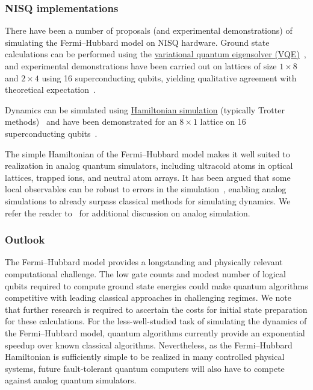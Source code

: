 \begin{refsection}
\subsubsection*{NISQ implementations}
There have been a number of proposals (and experimental demonstrations) of simulating the Fermi--Hubbard model on NISQ hardware. Ground state calculations can be performed using the \hyperref[prim:VQA]{variational quantum eigensolver (VQE)}~\cite{jiang2018,reiner2018, reiner2019,cai2020,cade2020FermiHubbardVQE}, and experimental demonstrations have been carried out on lattices of size $1 \times 8$ and $2 \times 4$ using 16 superconducting qubits, yielding qualitative agreement with theoretical expectation~\cite{stanisic2022VQEFermiHubbard}. 

Dynamics can be simulated using \hyperref[prim:HamiltonianSimulation]{Hamiltonian simulation} (typically Trotter methods)~\cite{clinton2021HamiltonianSimulationNearTermHubbard} and have been demonstrated for an $8 \times 1$ lattice on 16 superconducting qubits~\cite{arute2020ObservationFHModel}.

The simple Hamiltonian of the Fermi--Hubbard model makes it well suited to realization in analog quantum simulators, including ultracold atoms in optical lattices, trapped ions, and neutral atom arrays. It has been argued that some local observables can be robust to errors in the simulation~\cite{poggi2020,flannigan2022}, enabling analog simulations to already surpass classical methods for simulating dynamics. We refer the reader to~\cite{daley2022,gross2017} for additional discussion on analog simulation. 





\subsubsection*{Outlook}
The Fermi--Hubbard model provides a longstanding and physically relevant computational challenge. The low gate counts and modest number of logical qubits required to compute ground state energies could make quantum algorithms competitive with leading classical approaches in challenging regimes. We note that further research is required to ascertain the costs for initial state preparation for these calculations. For the less-well-studied task of simulating the dynamics of the Fermi--Hubbard model, quantum algorithms currently provide an exponential speedup over known classical algorithms. Nevertheless, as the Fermi--Hubbard Hamiltonian is sufficiently simple to be realized in many controlled physical systems, future fault-tolerant quantum computers will also have to compete against analog quantum simulators.





\end{refsection}
